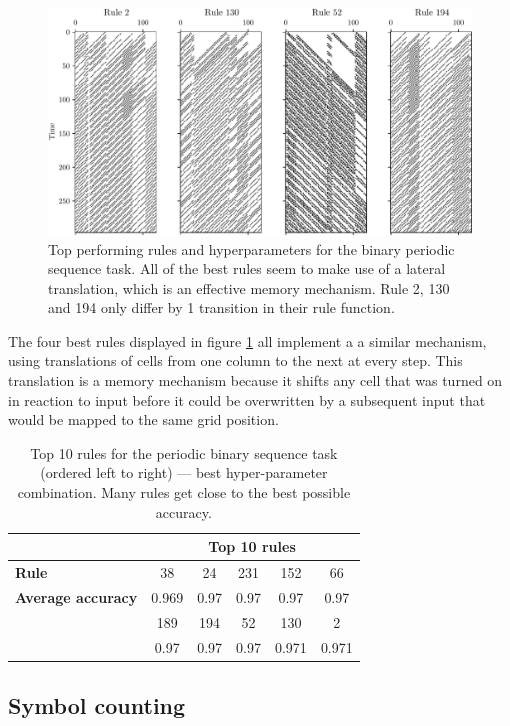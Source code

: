 \begin{figure}[htbp]
  \centering
  \includegraphics[width=.7\linewidth]{figures/periodic_top.pdf}
  \caption{Top performing rules and hyperparameters for the binary periodic
    sequence task. All of the best rules seem to make use of a lateral
    translation, which is an effective memory mechanism. Rule 2, 130 and 194
    only differ by 1 transition in their rule
    function.}\label{fig:top-binary-seq}
\end{figure}

The four best rules displayed in figure \ref{fig:top-binary-seq} all implement a
a similar mechanism, using translations of cells from one column to the next at
every step. This translation is a memory mechanism because it shifts any cell
that was turned on in reaction to input before it could be overwritten by a
subsequent input that would be mapped to the same grid position.

\begin{table}[htbp]
  \centering
    \begin{tabular}{p{4cm}ccccc}
      \toprule
      & \multicolumn{5}{c}{\bfseries Top 10 rules}\\
      \midrule
      \bfseries Rule & 38 & 24 & 231 & 152 & 66 \\
      \bfseries Average accuracy & 0.969 & 0.97 & 0.97 & 0.97 & 0.97 \\
      \midrule
      \hrulefill & 189 & 194 & 52 & 130 & 2 \\
      \hrulefill & 0.97 & 0.97 & 0.97 & 0.971 & 0.971\\
      \bottomrule
    \end{tabular}
  \caption{Top 10 rules for the periodic binary sequence task (ordered left to
    right) --- best hyper-parameter combination. Many rules get close to the best
    possible accuracy.}\label{tab:top_periodic_rules}
\end{table}

\subsection{Symbol counting}

